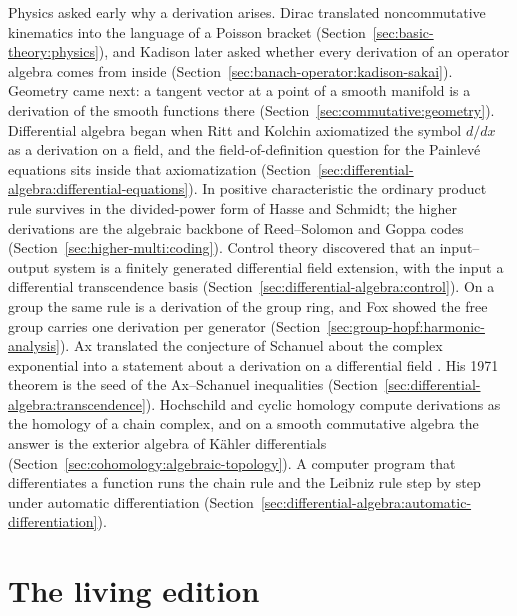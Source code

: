 Physics asked early why a derivation arises. Dirac %
\cite{Dirac1925} translated noncommutative kinematics into the language of a
Poisson bracket
(Section~\ref{sec:basic-theory:physics}), and Kadison \cite{Kadison1966} later
asked whether every derivation of an operator algebra comes from inside
(Section~\ref{sec:banach-operator:kadison-sakai}). Geometry came next: a tangent vector
at a point of a smooth manifold is a derivation of the smooth functions there
(Section~\ref{sec:commutative:geometry}). Differential algebra began when Ritt
and Kolchin axiomatized the symbol $d/dx$ as a derivation on a field, and the
field-of-definition question for the Painlev\'e equations sits inside that
axiomatization (Section~\ref{sec:differential-algebra:differential-equations}). In
positive characteristic the ordinary product rule survives in the
divided-power form of Hasse and Schmidt; the higher derivations are the
algebraic backbone of Reed--Solomon and Goppa codes
(Section~\ref{sec:higher-multi:coding}). Control theory discovered that an
input--output system is a finitely generated differential field extension,
with the input a differential transcendence basis
(Section~\ref{sec:differential-algebra:control}). On a group the same rule is a
derivation of the group ring, and Fox showed the free group carries one
derivation per generator (Section~\ref{sec:group-hopf:harmonic-analysis}).
Ax translated the conjecture of Schanuel about the complex exponential into a %
statement about a derivation on a differential field \cite{Ax1971}. His 1971 theorem is the
seed of the Ax--Schanuel inequalities
(Section~\ref{sec:differential-algebra:transcendence}). Hochschild and cyclic
homology compute derivations as the homology of a chain complex, and on a
smooth commutative algebra the answer is the exterior algebra of K\"ahler
differentials (Section~\ref{sec:cohomology:algebraic-topology}). A computer
program that differentiates a function runs the chain rule and the Leibniz
rule step by step under automatic differentiation
(Section~\ref{sec:differential-algebra:automatic-differentiation}).


\section*{The living edition}

